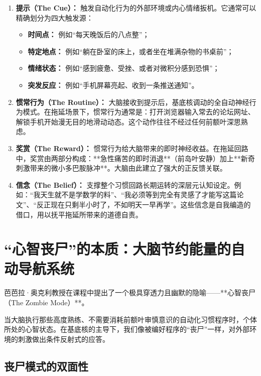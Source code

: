 \documentclass[12pt,a4paper,openany]{ctexbook}
\begin{document}
\begin{enumerate}
    \item \textbf{提示（The Cue）：}
    触发自动化行为的外部环境或内心情绪扳机。它通常可以精确划分为四大触发源：
    \begin{itemize}
        \item \textbf{时间点：} 例如“每天晚饭后的八点整”；
        \item \textbf{特定地点：} 例如“躺在卧室的床上，或者坐在堆满杂物的书桌前”；
        \item \textbf{情绪状态：} 例如“感到疲惫、受挫、或者对微积分感到恐惧”；
        \item \textbf{突发反应：} 例如“手机屏幕亮起、收到一条推送通知”。
    \end{itemize}

    \item \textbf{惯常行为（The Routine）：}
    大脑接收到提示后，基底核调动的全自动神经行为模式。在拖延场景下，惯常行为通常是：打开浏览器输入常去的论坛网址、解锁手机开始漫无目的地滑动动态。这个动作往往不经过任何前额叶深思熟虑。

    \item \textbf{奖赏（The Reward）：}
    惯常行为给大脑带来的即时神经收益。在拖延回路中，奖赏由两部分构成：**急性痛苦的即时消退**（前岛叶安静）加上**新奇刺激带来的微小多巴胺脉冲**。大脑由此建立了强大的正反馈关联。

    \item \textbf{信念（The Belief）：}
    支撑整个习惯回路长期运转的深层元认知设定。例如：“我天生就不是学数学的料”、“我必须等到完全有灵感了才能写这篇论文”、“反正现在只剩半小时了，不如明天一早再学”。这些信念是自我编造的借口，用以抚平拖延所带来的道德自责。
\end{enumerate}

\section{“心智丧尸”的本质：大脑节约能量的自动导航系统}

芭芭拉·奥克利教授在课程中提出了一个极具穿透力且幽默的隐喻——**心智丧尸（The Zombie Mode）**。

\begin{keypoint}
当大脑执行那些高度熟练、不需要消耗前额叶审慎意识的自动化习惯程序时，个体所处的心智状态。在基底核的主导下，我们像被编好程序的“丧尸”一样，对外部环境的刺激做出条件反射式的应答。
\end{keypoint}

\subsection*{丧尸模式的双面性}
\end{document}
